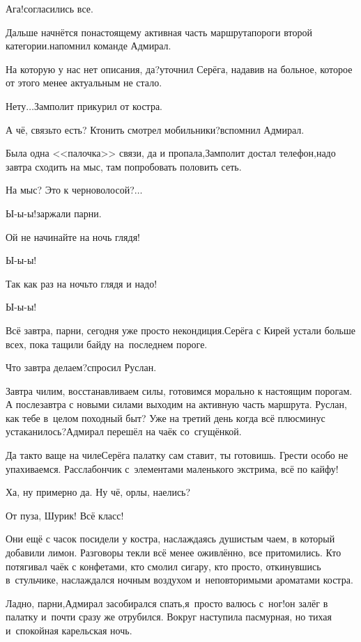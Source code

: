 \diagdash Ага!\mdash согласились все.

\diagdash Дальше начнётся по\sdash настоящему активная часть маршрута\mdash пороги второй категории.\mdash напомнил команде Адмирал.

\diagdash На которую у нас нет описания, да?\mdash уточнил Серёга, надавив на больное, которое от этого менее актуальным не стало.

\diagdash Нету$\ldots$\mdash Замполит прикурил от костра.

\diagdash А чё, связь\sdash то есть? Кто\sdash нить смотрел мобильники?\mdash вспомнил Адмирал.

\diagdash Была одна <<палочка>> связи, да и пропала,\mdash Замполит достал телефон,\mdash надо завтра сходить на мыс, там попробовать половить сеть.

\diagdash На мыс? Это к черноволосой?$\ldots$

\diagdash Ы-ы-ы!\mdash заржали парни.

\diagdash Ой не начинайте на ночь глядя!

\diagdash Ы-ы-ы!

\diagdash Так как раз на ночь\sdash то глядя и надо!

\diagdash Ы-ы-ы!

\diagdash Всё завтра, парни, сегодня уже просто некондиция.\mdash Серёга с Кирей устали больше всех, пока тащили байду на~последнем пороге.

\diagdash Что завтра делаем?\mdash спросил Руслан.

\diagdash Завтра чилим, восстанавливаем силы, готовимся морально к настоящим порогам. А послезавтра с новыми силами выходим на активную часть маршрута. Руслан, как тебе в~целом походный быт? Уже на третий  день когда всё плюс\sdash минус устаканилось?\mdash Адмирал перешёл на чаёк со~сгущёнкой.

\diagdash Да так\sdash то ваще на чиле\mdash Серёга палатку сам ставит, ты готовишь. Грести особо не упахиваемся. Расслабончик с~элементами маленького экстрима, всё по кайфу!

\diagdash Ха, ну примерно да. Ну чё, орлы, наелись?

\diagdash От пуза, Шурик! Всё класс!

Они ещё с часок посидели у костра, наслаждаясь душистым чаем, в который добавили лимон. Разговоры текли всё менее оживлённо, все притомились. Кто потягивал чаёк с конфетами, кто смолил сигару, кто просто, откинувшись в~стульчике, наслаждался ночным воздухом и~неповторимыми ароматами костра.

\diagdash Ладно, парни,\mdash Адмирал засобирался спать,\mdash я~просто валюсь с~ног!\mdash он залёг в палатку и~почти сразу же отрубился. Вокруг наступила пасмурная, но тихая и~спокойная карельская ночь.


\vspace{-0.2cm}
\begin{center}
\end{center}

